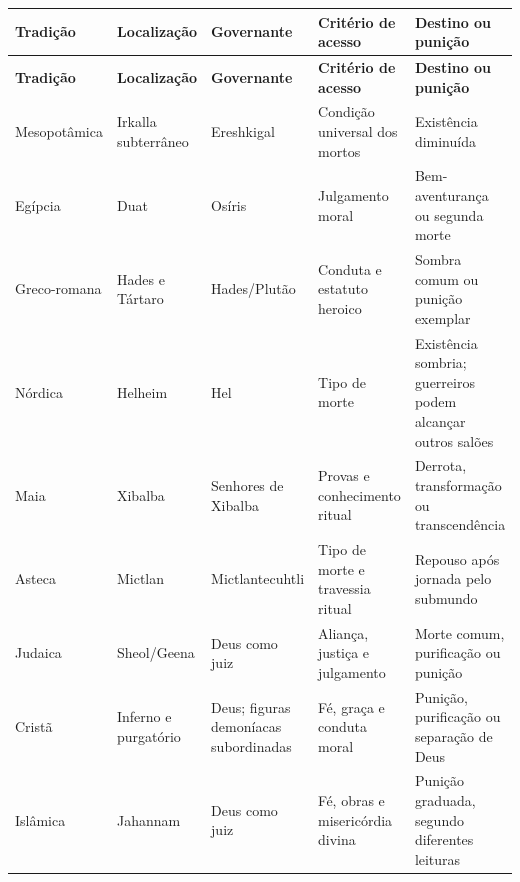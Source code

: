 \small
\renewcommand{\arraystretch}{1.2}
\begin{longtable}{@{}p{2.4cm}p{3.1cm}p{2.6cm}p{3.0cm}p{3.2cm}@{}}
  \toprule
  \textbf{Tradição} & \textbf{Localização} & \textbf{Governante} & \textbf{Critério de acesso} & \textbf{Destino ou punição} \\
  \midrule
  \endfirsthead
  \toprule
  \textbf{Tradição} & \textbf{Localização} & \textbf{Governante} & \textbf{Critério de acesso} & \textbf{Destino ou punição} \\
  \midrule
  \endhead
  Mesopotâmica & Irkalla subterrâneo & Ereshkigal & Condição universal dos mortos & Existência diminuída \\
  Egípcia & Duat & Osíris & Julgamento moral & Bem-aventurança ou segunda morte \\
  Greco-romana & Hades e Tártaro & Hades/Plutão & Conduta e estatuto heroico & Sombra comum ou punição exemplar \\
  Nórdica & Helheim & Hel & Tipo de morte & Existência sombria; guerreiros podem alcançar outros salões \\
  Maia & Xibalba & Senhores de Xibalba & Provas e conhecimento ritual & Derrota, transformação ou transcendência \\
  Asteca & Mictlan & Mictlantecuhtli & Tipo de morte e travessia ritual & Repouso após jornada pelo submundo \\
  Judaica & Sheol/Geena & Deus como juiz & Aliança, justiça e julgamento & Morte comum, purificação ou punição \\
  Cristã & Inferno e purgatório & Deus; figuras demoníacas subordinadas & Fé, graça e conduta moral & Punição, purificação ou separação de Deus \\
  Islâmica & Jahannam & Deus como juiz & Fé, obras e misericórdia divina & Punição graduada, segundo diferentes leituras \\
  \bottomrule
\end{longtable}
\normalsize
